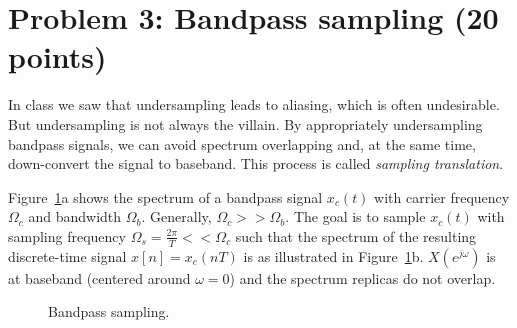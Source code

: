 \documentclass[10pt]{article}
\begin{document}
\newpage
\section*{Problem 3: Bandpass sampling (20 points)}

In class we saw that undersampling leads to aliasing, which is often undesirable. But undersampling is not always the villain. By appropriately undersampling bandpass signals, we can avoid spectrum overlapping and, at the same time, down-convert the signal to baseband. This process is called \textit{sampling translation}.

Figure~\ref{fig:bp_spectrum1}a shows the spectrum of a bandpass signal $x_c(t)$ with carrier frequency $\Omega_c$ and bandwidth $\Omega_b$. Generally, $\Omega_c >> \Omega_b$. The goal is to sample $x_c(t)$ with sampling frequency $\Omega_s = \frac{2\pi}{T} << \Omega_c$ such that the spectrum of the resulting discrete-time signal $x[n] = x_c(nT)$ is as illustrated in Figure~\ref{fig:bp_spectrum1}b. $X(e^{j\omega})$ is at baseband (centered around $\omega = 0$) and the spectrum replicas do not overlap. 


\begin{figure}[!h]
\centering
	\resizebox{0.87\textwidth}{!}{}
    \caption{Bandpass sampling.} \label{fig:bp_spectrum1}
\end{figure}
\end{document}
